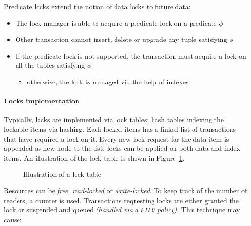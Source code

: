 \documentclass[english]{article}
\begin{document}
Predicate locks extend the notion of data locks to future data:
\begin{itemize}
  \item The lock manager is able to acquire a predicate lock on a predicate \(\phi\)
  \item Other transaction cannot insert, delete or upgrade any tuple satisfying \(\phi\)
  \item If the predicate lock is not supported, the transaction must acquire a lock on all the tuples satisfying \(\phi\)
        \begin{itemize}
          \item otherwise, the lock is managed via the help of indexes
        \end{itemize}
\end{itemize}

\paragraph{Locks implementation}

Typically, locks are implemented via lock tables: hash tables indexing the lockable items via hashing.
Each locked items has a linked list of transactions that have required a lock on it.
Every new lock request for the data item is appended as new node to the list;
locks can be applied on both data and index items.
An illustration of the lock table is shown in Figure~\ref{fig:lock-table}.

\begin{figure}[htbp]
  \centering
  \bigskip
  \caption{Illustration of a lock table}
  \label{fig:lock-table}
  \bigskip
\end{figure}

Resources can be \textit{free}, \textit{read-locked} or \textit{write-locked}.
To keep track of the number of readers, a counter is used.
Transactions requesting locks are either granted the lock or suspended and queued \textit{(handled via a \texttt{FIFO} policy)}.
This technique may cause:
\end{document}
